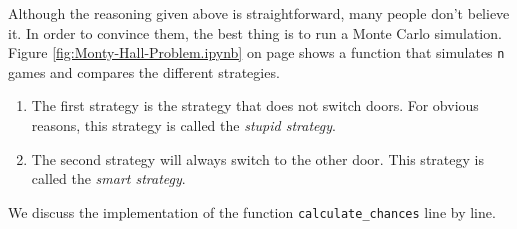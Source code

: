 Although the reasoning given above is straightforward, many people don't believe it.  In order to
convince them, the best thing is to run a Monte Carlo simulation.  Figure \ref{fig:Monty-Hall-Problem.ipynb}
on page 
\pageref{fig:Monty-Hall-Problem.ipynb} shows a function that simulates \texttt{n} games and compares the
different strategies.  
\begin{enumerate}
\item The first strategy is the strategy that does not switch doors.
      For obvious reasons, this strategy is called the \emph{stupid strategy}.
\item The second strategy will always switch to the other door.
      This strategy is called the \emph{smart strategy}.
\end{enumerate}
We discuss the implementation of the function \texttt{calculate\_chances} line by line.
